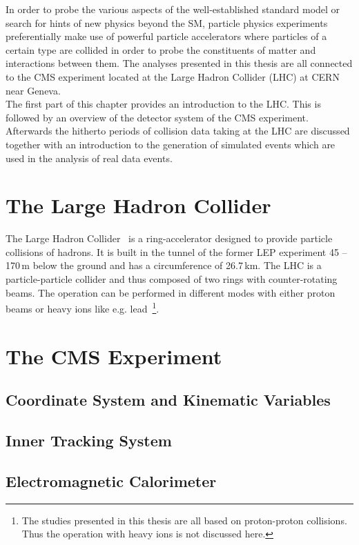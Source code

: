 In order to probe the various aspects of the well-established standard model or search for hints of new physics beyond the SM, particle physics experiments preferentially make use of powerful particle accelerators where particles of a certain type are collided in order to probe the constituents of matter and interactions between them. The analyses presented in this thesis are all connected to the CMS experiment located at the Large Hadron Collider (LHC) at CERN near Geneva. \\ 
The first part of this chapter provides an introduction to the LHC. This is followed by an overview of the detector system of the CMS experiment. Afterwards the hitherto periods of collision data taking at the LHC are discussed together with an introduction to the generation of simulated events which are used in the analysis of real data events.  
\section{The Large Hadron Collider}
\label{sec:lhc}
The Large Hadron Collider~\cite{1748-0221-3-08-S08001,Bruning:782076} is a ring-accelerator designed to provide particle collisions of hadrons. It is built in the tunnel of the former LEP experiment  45 -- 170\,m below the ground and has a circumference of 26.7\,km. The LHC is a particle-particle collider and thus composed of two rings with counter-rotating beams. The operation can be performed in different modes with either proton beams or heavy ions like e.g. lead~\footnote{The studies presented in this thesis are all based on proton-proton collisions. Thus the operation with heavy ions is not discussed here.}. 

\section{The CMS Experiment}
\label{sec:cms}

\subsection{Coordinate System and Kinematic Variables}
\label{subsec:cms_coordinates}

\subsection{Inner Tracking System}
\label{subsec:cms_tracker}

\subsection{Electromagnetic Calorimeter}
\label{subsec:cms_ecal}


